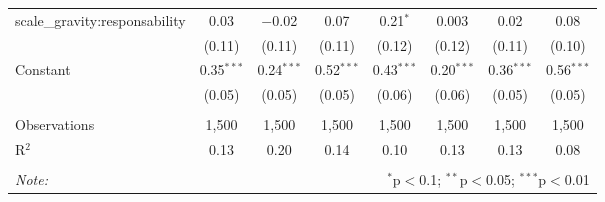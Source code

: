 \documentclass[
]{article}
\begin{document}
\begin{sidewaystable}[!htbp]
\begin{tabular}{@{\extracolsep{1pt}}lccccccc}
  scale\_gravity:responsability & 0.03 & $-$0.02 & 0.07 & 0.21$^{*}$ & 0.003 & 0.02 & 0.08 \\ 
  & (0.11) & (0.11) & (0.11) & (0.12) & (0.12) & (0.11) & (0.10) \\ 
  Constant & 0.35$^{***}$ & 0.24$^{***}$ & 0.52$^{***}$ & 0.43$^{***}$ & 0.20$^{***}$ & 0.36$^{***}$ & 0.56$^{***}$ \\ 
  & (0.05) & (0.05) & (0.05) & (0.06) & (0.06) & (0.05) & (0.05) \\ 
 \hline \\[-1.8ex] 
Observations & 1,500 & 1,500 & 1,500 & 1,500 & 1,500 & 1,500 & 1,500 \\ 
R$^{2}$ & 0.13 & 0.20 & 0.14 & 0.10 & 0.13 & 0.13 & 0.08 \\ 
\hline 
\hline \\[-1.8ex] 
\textit{Note:}  & \multicolumn{7}{r}{$^{*}$p$<$0.1; $^{**}$p$<$0.05; $^{***}$p$<$0.01} \\ 
\end{tabular} 
\end{sidewaystable}
\end{document}
